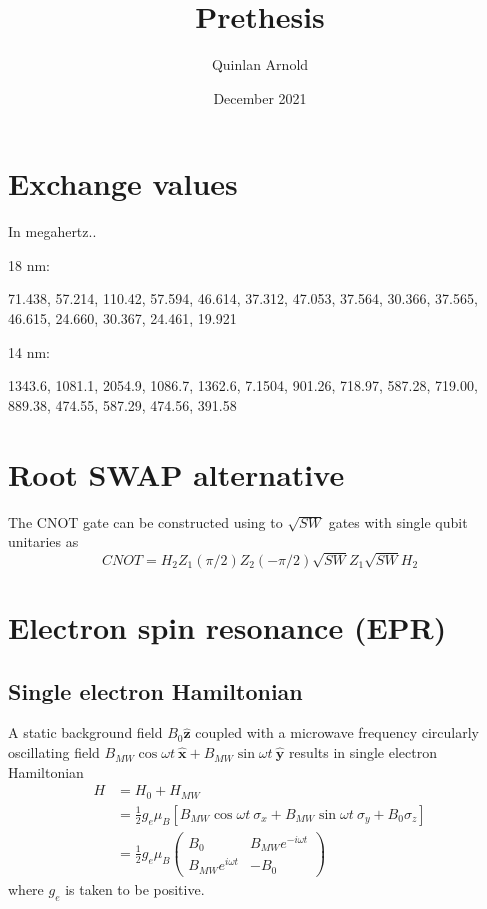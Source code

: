 \documentclass[12pt]{article}
\title{Prethesis}
\author{Quinlan Arnold}
\date{December 2021}
\begin{document}
\maketitle


\section{Exchange values}
In megahertz..

18 nm: 

71.438, 57.214, 110.42, 57.594, 46.614, 37.312, 47.053,
        37.564, 30.366, 37.565, 46.615, 24.660, 30.367, 24.461,
        19.921

14 nm: 

1343.6, 1081.1, 2054.9, 1086.7, 1362.6, 7.1504,
        901.26, 718.97, 587.28, 719.00, 889.38, 474.55,
        587.29, 474.56, 391.58

\section{Root SWAP alternative}
The CNOT gate can be constructed using to $\sqrt{SW}$ gates with single qubit unitaries as\cite{loss_quantum_1998}
\begin{equation}
    CNOT = H_2Z_1(\pi/2)Z_2(-\pi/2)\sqrt{SW}Z_1\sqrt{SW}H_2
\end{equation}

\section{Electron spin resonance (EPR)}
\subsection{Single electron Hamiltonian}
A static background field $B_0\bm{\hat{z}}$ coupled with a microwave frequency circularly oscillating field $B_{MW}\cos\omega t\ \bm{\hat{x}} + B_{MW}\sin\omega t\ \bm{\hat{y}}$ results in single electron Hamiltonian
\begin{align}
    H &= H_0 + H_{MW}\\ &= \frac{1}{2}g_e\mu_B \left[B_{MW}\cos\omega t\ \sigma_x + B_{MW}\sin\omega t\ \sigma_y + B_0\sigma_z\right]\\ 
    &= \frac{1}{2}g_e\mu_B\begin{pmatrix}B_0 &B_{MW}e^{-i\omega t}\\ B_{MW}e^{i\omega t} &-B_0\end{pmatrix}
\end{align}
where $g_e$ is taken to be positive.
\end{document}
